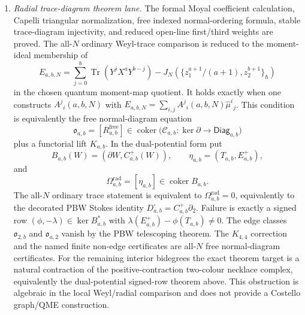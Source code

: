 \begin{stmt}
\begin{enumerate}[label=(\arabic*)]
    \item \emph{Radial trace-diagram theorem lane.}  The formal Moyal
    coefficient calculation, Capelli triangular normalization, free
    indexed normal-ordering formula, stable trace-diagram injectivity, and
    reduced open-line first/third weights are proved.  The all-\(N\)
    ordinary Weyl-trace comparison is reduced to the moment-ideal
    membership of
    \[
      E_{a,b,N}
      =
      \sum_{j=0}^{b}\operatorname{Tr}(Y^jX^aY^{b-j})
      -
      J_N\!\left(
        \{z_1^{a+1}/(a+1),z_2^{b+1}\}_\hbar
      \right)
    \]
    in the chosen quantum moment-map quotient.  It holds exactly when one
    constructs \(A^j{}_i(a,b,N)\) with
    \(E_{a,b,N}=\sum_{i,j}A^j{}_i(a,b,N)\widehat\mu^i{}_j\).  This
    condition is equivalently the free normal-diagram equation
    \[
      \mathfrak o_{a,b}
      =
      [R^{\mathrm{free}}_{a,b}]
      \in
      \operatorname{coker}
      \bigl(\mathcal C_{a,b}\colon\ker\partial\to
      \mathsf{Diag}_{a,b}\bigr)
    \]
    plus a functorial lift \(K_{a,b}\).  In the dual-potential form put
    \[
      B_{a,b}(W)=(\partial W,C^+_{a,b}(W)),\qquad
      \eta_{a,b}=(T_{a,b},E^+_{a,b}),
    \]
    and
    \[
      \Omega^{\mathrm{rad}}_{a,b}
      =
      [\eta_{a,b}]\in\operatorname{coker}B_{a,b}.
    \]
    The all-\(N\) ordinary trace statement is equivalent to
    \(\Omega^{\mathrm{rad}}_{a,b}=0\), equivalently to the decorated PBW
    Stokes identity \(D^\square_{a,b}=C^+_{a,b}\partial_2\).  Failure is
    exactly a signed row \((\phi,-\lambda)\in\ker B_{a,b}^*\) with
    \(\lambda(E^+_{a,b})-\phi(T_{a,b})\ne0\).  The edge classes
    \(\mathfrak o_{2,b}\) and \(\mathfrak o_{a,2}\) vanish by the PBW
    telescoping theorem.  The \(K_{4,4}\) correction and the named finite
    non-edge certificates are all-\(N\) free normal-diagram certificates.
    For the remaining interior bidegrees the exact theorem target is a
    natural contraction of the positive-contraction two-colour necklace
    complex, equivalently the dual-potential signed-row theorem above.
    This obstruction is algebraic in the local Weyl/radial
    comparison and does not provide a Costello graph/QME construction.
  \end{enumerate}


\end{stmt}
